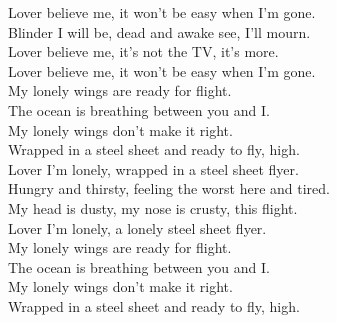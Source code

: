 Lover believe me, it won't be easy when I'm gone. \\
Blinder I will be, dead and awake see, I'll mourn. \\
Lover believe me, it's not the TV, it's more. \\
Lover believe me, it won't be easy when I'm gone. \\

My lonely wings are ready for flight. \\
The ocean is breathing between you and I. \\
My lonely wings don't make it right. \\
Wrapped in a steel sheet and ready to fly, high. \\

Lover I'm lonely, wrapped in a steel sheet flyer. \\
Hungry and thirsty, feeling the worst here and tired. \\
My head is dusty, my nose is crusty, this flight. \\
Lover I'm lonely, a lonely steel sheet flyer. \\

My lonely wings are ready for flight. \\
The ocean is breathing between you and I. \\
My lonely wings don't make it right. \\
Wrapped in a steel sheet and ready to fly, high. \\
